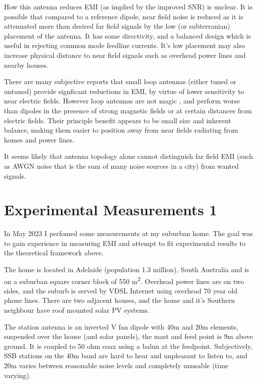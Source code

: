 \documentclass{article}
\begin{document}
How this antenna reduces EMI (as implied by the improved SNR) is unclear. It is possible that compared to a reference dipole, near field noise is reduced as it is attenuated more than desired far field signals by the low (or subterranian) placement of the antenna.  It has some directivity, and a balanced design which is useful in rejecting common mode feedline currents.  It's low placement may also increase physical distance to near field signals such as overhead power lines and nearby houses. 

There are many subjective reports that small loop antennas (either tuned or untuned) provide signficant reductions in EMI, by virtue of lower sensitivity to near electric fields.  However loop antennas are not magic \cite{w8ji_radio_noise}, and perform worse than dipoles in the presence of strong magnetic fields or at certain distances from electric fields.  Their principle benefit appears to be small size and inherent balance, making them easier to position away from near fields radiating from homes and power lines.

It seems likely that antenna topology alone cannot distinguish far field EMI (such as AWGN noise that is the sum of many noise sources in a city) from wanted signals.

\section{Experimental Measurements 1}

In May 2023 I perfomed some measurements at my suburban home.  The goal was to gain experience in measuring EMI and attempt to fit experimental results to the theoretical framework above.

The home is located in Adelaide (population 1.3 million), South Australia and is on a suburban square corner block of 550 \si{\metre\squared}.  Overhead power lines are on two sides, and the suburb is served by VDSL Internet using overhead 70 year old phone lines.  There are two adjacent houses, and the home and it's Southern neighbour have roof mounted solar PV systems.

The station antenna is an inverted V fan dipole with 40m and 20m elements, suspended over the house (and solar panels), the mast and feed point is 9m above ground. It is coupled to 50 ohm coax using a balun at the feedpoint. Subjectively, SSB stations on the 40m band are hard to hear and unpleasant to listen to, and 20m varies between reasonable noise levels and completely unusable (time varying).
\end{document}
